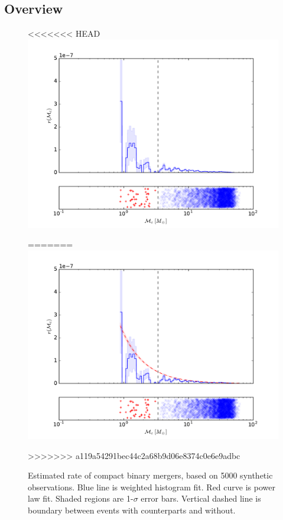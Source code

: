 \subsection{Overview}

\begin{figure}[ht]
<<<<<<< HEAD
  \includegraphics[width=\columnwidth]{img/output/chirp-mass-distribution}
  \caption{}
=======
  \includegraphics[width=\columnwidth]{img/chirp-mass-distribution}
  \caption{Estimated rate of compact binary mergers, based on 5000 synthetic observations. Blue line is weighted histogram fit. Red curve is power law fit. Shaded regions are 1-$\sigma$ error bars. Vertical dashed line is boundary between events with counterparts and without.}
>>>>>>> a119a54291bec44c2a68b9d06e8374c0e6e9adbc
  \label{fig:chirp}
\end{figure}

